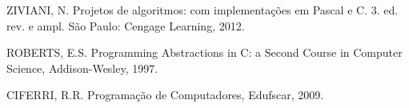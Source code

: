 {{        ZIVIANI, N. Projetos de algoritmos: com implementações em Pascal e C. 3. ed. rev. e ampl. São Paulo: Cengage Learning, 2012.

        ROBERTS,  E.S. Programming Abstractions in C: a Second Course in Computer Science, Addison-Wesley, 1997.

        CIFERRI,  R.R. Programação de Computadores, Edufscar, 2009.
    }
}